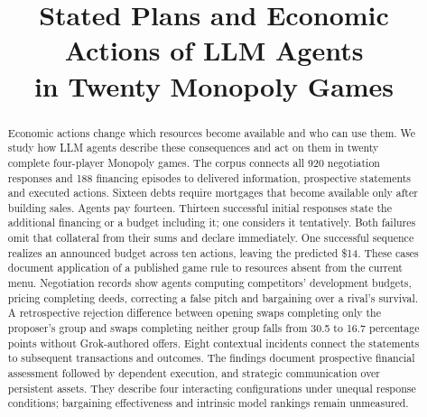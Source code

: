\documentclass[10pt,twocolumn,letterpaper]{article}
\title{Stated Plans and Economic Actions of LLM Agents\\in Twenty Monopoly Games}
\author{}
\date{}
\begin{document}





\maketitle
\begin{abstract}
Economic actions change which resources become available and who can use them. We study how LLM agents describe these consequences and act on them in twenty complete four-player Monopoly games. The corpus connects all 920 negotiation responses and 188 financing episodes to delivered information, prospective statements and executed actions. Sixteen debts require mortgages that become available only after building sales. Agents pay fourteen. Thirteen successful initial responses state the additional financing or a budget including it; one considers it tentatively. Both failures omit that collateral from their sums and declare immediately. One successful sequence realizes an announced budget across ten actions, leaving the predicted \$14. These cases document application of a published game rule to resources absent from the current menu. Negotiation records show agents computing competitors' development budgets, pricing completing deeds, correcting a false pitch and bargaining over a rival's survival. A retrospective rejection difference between opening swaps completing only the proposer's group and swaps completing neither group falls from 30.5 to 16.7 percentage points without Grok-authored offers. Eight contextual incidents connect the statements to subsequent transactions and outcomes. The findings document prospective financial assessment followed by dependent execution, and strategic communication over persistent assets. They describe four interacting configurations under unequal response conditions; bargaining effectiveness and intrinsic model rankings remain unmeasured.
\end{abstract}






\begingroup\small\setlength{\bibsep}{2pt}

\endgroup
\clearpage\onecolumn\appendix

\end{document}
